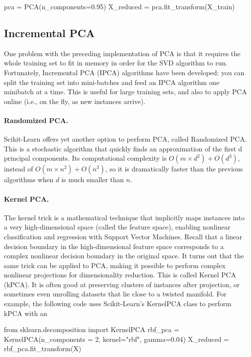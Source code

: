\documentclass[%
oneside,                 %
final,                   %
10pt]{article}
\begin{document}
\bpycod
pca = PCA(n_components=0.95)
X_reduced = pca.fit_transform(X_train)

\epycod


\subsection{Incremental PCA}

One problem with the preceding implementation of PCA is that it requires the whole training set to fit in
memory in order for the SVD algorithm to run. Fortunately, Incremental PCA (IPCA) algorithms have
been developed: you can split the training set into mini-batches and feed an IPCA algorithm one minibatch
at a time. This is useful for large training sets, and also to apply PCA online (i.e., on the fly, as new
instances arrive).

\paragraph{Randomized PCA.}
Scikit-Learn offers yet another option to perform PCA, called Randomized PCA. This is a stochastic
algorithm that quickly finds an approximation of the first d principal components. Its computational
complexity is $O(m \times d^2)+O(d^3)$, instead of $O(m \times n^2) + O(n^3)$, so it is dramatically faster than the
previous algorithms when $d$ is much smaller than $n$.

\paragraph{Kernel PCA.}
The kernel trick is a mathematical technique that implicitly maps instances into a
very high-dimensional space (called the feature space), enabling nonlinear classification and regression
with Support Vector Machines. Recall that a linear decision boundary in the high-dimensional feature
space corresponds to a complex nonlinear decision boundary in the original space.
It turns out that the same trick can be applied to PCA, making it possible to perform complex nonlinear
projections for dimensionality reduction. This is called Kernel PCA (kPCA). It is often good at
preserving clusters of instances after projection, or sometimes even unrolling datasets that lie close to a
twisted manifold.
For example, the following code uses Scikit-Learn’s KernelPCA class to perform kPCA with an




\bpycod
from sklearn.decomposition import KernelPCA
rbf_pca = KernelPCA(n_components = 2, kernel="rbf", gamma=0.04)
X_reduced = rbf_pca.fit_transform(X)
\end{document}
